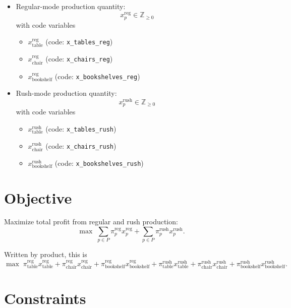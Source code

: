 \begin{itemize}
    \item Regular-mode production quantity:
    \[
    x_p^{\mathrm{reg}} \in \mathbb{Z}_{\ge 0}
    \]
    with code variables
    \begin{itemize}
        \item $x_{\text{table}}^{\mathrm{reg}}$ (code: \texttt{x\_tables\_reg})
        \item $x_{\text{chair}}^{\mathrm{reg}}$ (code: \texttt{x\_chairs\_reg})
        \item $x_{\text{bookshelf}}^{\mathrm{reg}}$ (code: \texttt{x\_bookshelves\_reg})
    \end{itemize}

    \item Rush-mode production quantity:
    \[
    x_p^{\mathrm{rush}} \in \mathbb{Z}_{\ge 0}
    \]
    with code variables
    \begin{itemize}
        \item $x_{\text{table}}^{\mathrm{rush}}$ (code: \texttt{x\_tables\_rush})
        \item $x_{\text{chair}}^{\mathrm{rush}}$ (code: \texttt{x\_chairs\_rush})
        \item $x_{\text{bookshelf}}^{\mathrm{rush}}$ (code: \texttt{x\_bookshelves\_rush})
    \end{itemize}
\end{itemize}

\section*{Objective}

Maximize total profit from regular and rush production:
\[
\max \;
\sum_{p \in P} \pi_p^{\mathrm{reg}} x_p^{\mathrm{reg}}
+
\sum_{p \in P} \pi_p^{\mathrm{rush}} x_p^{\mathrm{rush}}.
\]

Written by product, this is
\[
\max \;
\pi_{\text{table}}^{\mathrm{reg}} x_{\text{table}}^{\mathrm{reg}}
+\pi_{\text{chair}}^{\mathrm{reg}} x_{\text{chair}}^{\mathrm{reg}}
+\pi_{\text{bookshelf}}^{\mathrm{reg}} x_{\text{bookshelf}}^{\mathrm{reg}}
+\pi_{\text{table}}^{\mathrm{rush}} x_{\text{table}}^{\mathrm{rush}}
+\pi_{\text{chair}}^{\mathrm{rush}} x_{\text{chair}}^{\mathrm{rush}}
+\pi_{\text{bookshelf}}^{\mathrm{rush}} x_{\text{bookshelf}}^{\mathrm{rush}}.
\]

\section*{Constraints}

